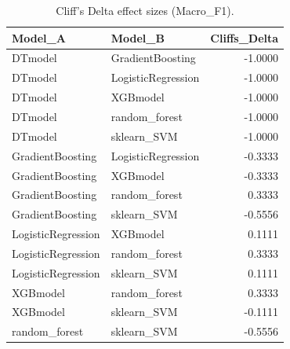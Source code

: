 \begin{table}[t]
\centering
\begin{tabular}{llr}
\toprule
Model_A & Model_B & Cliffs_Delta \\
\midrule
DTmodel & GradientBoosting & -1.0000 \\
DTmodel & LogisticRegression & -1.0000 \\
DTmodel & XGBmodel & -1.0000 \\
DTmodel & random_forest & -1.0000 \\
DTmodel & sklearn_SVM & -1.0000 \\
GradientBoosting & LogisticRegression & -0.3333 \\
GradientBoosting & XGBmodel & -0.3333 \\
GradientBoosting & random_forest & 0.3333 \\
GradientBoosting & sklearn_SVM & -0.5556 \\
LogisticRegression & XGBmodel & 0.1111 \\
LogisticRegression & random_forest & 0.3333 \\
LogisticRegression & sklearn_SVM & 0.1111 \\
XGBmodel & random_forest & 0.3333 \\
XGBmodel & sklearn_SVM & -0.1111 \\
random_forest & sklearn_SVM & -0.5556 \\
\bottomrule
\end{tabular}
\caption{Cliff's Delta effect sizes (Macro_F1).}
\label{tab:cliffs_Macro_F1}
\end{table}